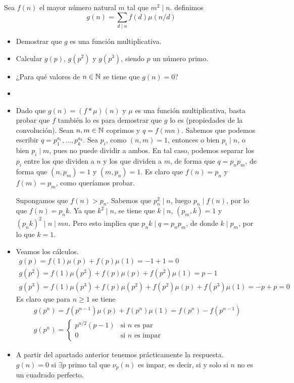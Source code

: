 \documentclass[twoside]{article}
\begin{document}
\begin{ejercicio}{9}
Sea $f(n)$ el mayor número natural $m$ tal que $m^2\mid n$. definimos
\[
g(n) = \sum_{d\mid n} f(d)\mu(n/d)
\]
\begin{itemize}
\item Demostrar que $g$ es una función multiplicativa.
\item Calcular $g(p)$, $g(p^2)$ y $g(p^3)$, siendo $p$ un número primo.
\item ¿Para qué valores de $n\in\mathbb{N}$ se tiene que $g(n)=0$?
\end{itemize}
\begin{sol}
\begin{itemize}
\item[]
\item Dado que $g(n) = (f\ast \mu)(n)$ y $\mu$ es una función multiplicativa, basta probar que $f$ también lo es para demostrar que $g$ lo es (propiedades de la convolución). Sean $n,m\in \mathbb{N}$ coprimos y $q=f(mn)$. Sabemos que podemos escribir $q=p_1^{a_1},\dotsc,p_k^{a_k}$. Sea $p_i$, como $(n,m)=1$, entonces o bien $p_i \mid n$, o bien $p_i \mid m$, pues no puede dividir a ambos. En tal caso, podemos separar los $p_i$ entre los que dividen a $n$ y los que dividen a $m$, de forma que $q=p_np_m$, de forma que $(n,p_m)=1$ y $(m,p_n)=1$. Es claro que $f(n)=p_n$ y $f(m)=p_m$, como queríamos probar.

Supongamos que $f(n)>p_n$. Sabemos que $p_n^2\mid n$, luego $p_n \mid f(n)$, por lo que $f(n)=p_n k$. Ya que $k^2 \mid n$, se tiene que $k \mid n$, $(p_m,k)=1$ y $(p_n k)^2 \mid n \mid mn$. Pero esto implica que $p_n k \mid q = p_n p_m$, de donde $k \mid p_m$, por lo que $k=1$.
\item Veamos los cálculos.
\begin{gather*}
g(p)=f(1)\mu(p) + f(p)\mu(1) = -1+1 = 0 \\
g(p^2) = f(1)\mu(p^2) + f(p)\mu(p) + f(p^2)\mu(1) = p-1\\
g(p^3) = f(1)\mu(p^3) + f(p)\mu(p^2) + f(p^2)\mu(p) + f(p^3)\mu(1) = -p+p=0
\end{gather*}
Es claro que para $n\geq 1$ se tiene
\begin{gather*}
g(p^n) = f(p^{n-1})\mu(p) + f(p^n)\mu(1) = f(p^n)-f(p^{n-1})\\
g(p^n) = 
\begin{cases}
p^{n/2}(p-1) & \text{si $n$ es par}\\
0 			& \text{si $n$ es impar}
\end{cases}
\end{gather*}
\item A partir del apartado anterior tenemos prácticamente la respuesta. $g(n)=0$ si $\exists p$ primo tal que $\nu_p(n)$ es impar, es decir, si y solo si $n$ no es un cuadrado perfecto.
\end{itemize}
\end{sol}
\end{ejercicio}
\end{document}
